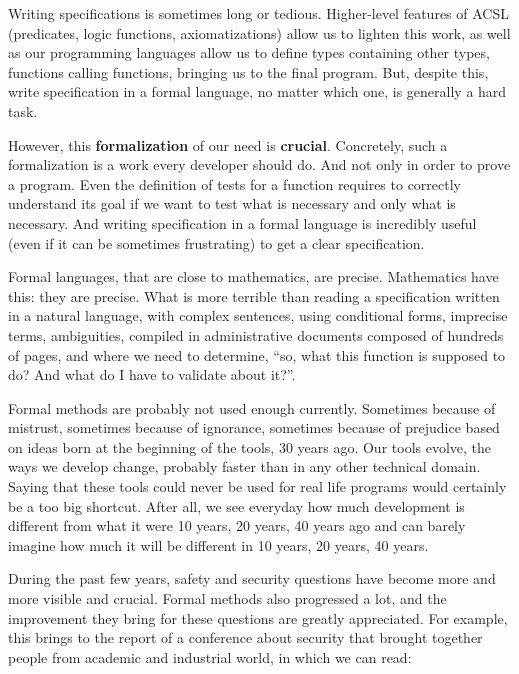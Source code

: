 Writing specifications is sometimes long or tedious. Higher-level
features of ACSL (predicates, logic functions, axiomatizations) allow us
to lighten this work, as well as our programming languages allow us to
define types containing other types, functions calling functions, bringing
us to the final program. But, despite this, write specification in a
formal language, no matter which one, is generally a hard task.

However, this \textbf{formalization} of our need is \textbf{crucial}.
Concretely, such a formalization is a work every developer should do.
And not only in order to prove a program. Even the definition of tests
for a function requires to correctly understand its goal if we want to
test what is necessary and only what is necessary. And writing
specification in a formal language is incredibly useful (even if it can
be sometimes frustrating) to get a clear specification.

Formal languages, that are close to mathematics, are precise.
Mathematics have this: they are precise. What is more terrible than
reading a specification written in a natural language, with complex
sentences, using conditional forms, imprecise terms, ambiguities,
compiled in administrative documents composed of hundreds of pages, and
where we need to determine, ``so, what this function is supposed to do?
And what do I have to validate about it?''.

Formal methods are probably not used enough currently. Sometimes because of
mistrust, sometimes because of ignorance, sometimes because of prejudice
based on ideas born at the beginning of the tools, 30 years ago. Our tools
evolve, the ways we develop change, probably faster than in any other
technical domain. Saying that these tools could never be
used for real life programs would certainly be a too big shortcut. After
all, we see everyday how much development is different from what it were
10 years, 20 years, 40 years ago and can barely imagine how much it will
be different in 10 years, 20 years, 40 years.

During the past few years, safety and security questions have become
more and more visible and crucial. Formal methods also progressed a lot,
and the improvement they bring for these questions are greatly
appreciated. For example, this
 brings to the
report of a conference about security that brought together people from
academic and industrial world, in which we can read:



